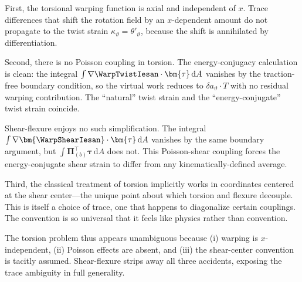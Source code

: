 First, the torsional warping function is axial and independent of $x$. 
Trace differences that shift the rotation field by an $x$-dependent amount 
do not propagate to the twist strain $\kappa_\vartheta = \theta'_\vartheta$, 
because the shift is annihilated by differentiation.

Second, there is no Poisson coupling in torsion. The energy-conjugacy 
calculation is clean: the integral 
$\int \nabla\WarpTwistIesan \cdot \bm{\tau} \, \mathrm{d}A$ vanishes by the 
traction-free boundary condition, so the virtual work reduces to 
$\delta a_\vartheta \cdot T$ with no residual warping contribution. The 
``natural'' twist strain and the ``energy-conjugate'' twist strain coincide.

Shear-flexure enjoys no such simplification. The integral 
$\int \nabla\bm{\WarpShearIesan} \cdot \bm{\tau} \, \mathrm{d}A$ vanishes by 
the same boundary argument, but 
$\int \bm{\Pi}_{(b)}^\top \bm{\tau} \, \mathrm{d}A$ does not. This Poisson-shear 
coupling forces the energy-conjugate shear strain to differ from any 
kinematically-defined average.

Third, the classical treatment of torsion implicitly works in coordinates 
centered at the shear center---the unique point about which torsion and 
flexure decouple. This is itself a choice of trace, one that happens to 
diagonalize certain couplings. The convention is so universal that it feels 
like physics rather than convention.

The torsion problem thus appears unambiguous because (i) warping is 
$x$-independent, (ii) Poisson effects are absent, and (iii) the shear-center 
convention is tacitly assumed. Shear-flexure strips away all three accidents, 
exposing the trace ambiguity in full generality.